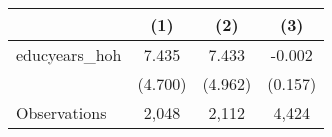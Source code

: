 \begin{tabular}{l*{3}c}
\hline\hline
 & (1) & (2) & (3) \\
\hline
educyears\_hoh&7.435&7.433&-0.002\\
&(4.700)&(4.962)&(0.157)\\
\hline
Observations & 2,048 & 2,112 & 4,424 \\
\hline\hline
\end{tabular}
